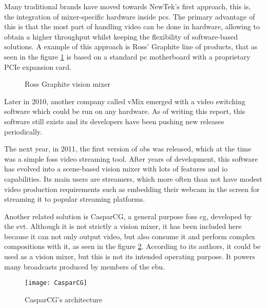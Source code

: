 \documentclass[../main.tex]{subfiles}
\begin{document}
Many traditional brands have moved towards NewTek's first approach, this is, the integration of mixer-specific hardware inside \glspl{pc}. The primary advantage of this is that the most part of handling video can be done in hardware, allowing to obtain a higher throughput whilst keeping the flexibility of software-based solutions. A example of this approach is Ross' Graphite line of products, that as seen in the figure \ref{fig:02:ross_graphite} is based on a standard \gls{pc} motherboard with a proprietary PCIe expansion card\cite{graphiteManual}.\newline

\begin{figure}[htbp]
    \centering

    \caption{Ross Graphite vision mixer}
    \label{fig:02:ross_graphite}
\end{figure}

Later in 2010, another company called vMix emerged with a video switching software which could be run on any hardware. As of writing this report, this software still exists and its developers have been pushing new releases periodically.\newline

The next year, in 2011, the first version of \gls{obs} was released, which at the time was a simple \gls{foss} video streaming tool. After years of development, this software has evolved into a scene-based vision mixer with lots of features and \gls{io} capabilities\cite{obsWiki}. Its main users are streamers, which more often than not have modest video production requirements such as embedding their webcam in the screen for streaming it to popular streaming platforms.\newline

Another related solution is CasparCG, a general purpose \gls{foss} \gls{cg}, developed by the \gls{svt}. Although it is not strictly a vision mixer, it has been included here because it can not only output video, but also consume it and perform complex compositions with it, as seen in the figure \ref{fig:02:casparcg}. According to its authors, it could be used as a vision mixer, but this is not its intended operating purpose. It powers many broadcasts produced by members of the \gls{ebu}\cite{casparcgWiki}.\newline

\begin{figure}[htbp]
    \centering
    \texttt{[image: CasparCG]}
    \caption{CasparCG's architecture}
    \label{fig:02:casparcg}
\end{figure}
\end{document}
